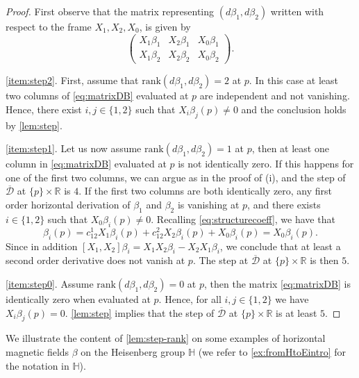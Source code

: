 \documentclass{amsart}
\theoremstyle{plain}
\theoremstyle{definition}
\theoremstyle{remark}
\newcommand{\R}{\mathbb{R}}
\newcommand{\diff}{d}%
\newcommand{\distr}{\mathcal{D}}								%
\newcommand{\B}{\beta}
\newcommand{\lift}[1]{\overline{#1}} 							%
\begin{document}
\begin{proof}
First observe that the matrix representing  $\left(\diff \B_1,\diff \B_2\right)$ written with respect to the frame $X_1,X_2,X_0$, is given by
\begin{equation}
\label{eq:matrixDB}
 \left( \begin{array}{ccc}
 X_1\B_1 &  X_2\B_1 &  X_0\B_1 \\
  X_1\B_2 &  X_2\B_2 &  X_0\B_2 
 \end{array} \right).
\end{equation}

\ref{item:step2}.
First, assume that $\mathrm{rank}\left(\diff \B_1,\diff \B_2\right)=2$ at $p$. In this case at least two columns of \eqref{eq:matrixDB} evaluated at $p$ are independent and not vanishing.  
Hence, there exist $i,j\in\{1,2\}$ such that $X_i\B_j(p) \neq 0$ and the conclusion holds by \cref{lem:step}.

\ref{item:step1}.
Let us now assume $\mathrm{rank}\left(\diff \B_1,\diff \B_2\right)=1$ at $p$, then at least one column in \eqref{eq:matrixDB} evaluated at $p$ is not identically zero. 
If this happens for one of the first two columns, we can argue as in the proof of (i), and the step of $\lift \distr$ at ${\{p\}\times \R}$ is $4$.
If the first two columns are both identically zero, any first order horizontal derivation of $\B_1$ and $\B_2$ is vanishing at $p$, and there exists $i\in \{1,2\}$  such that $X_0\B_i(p)\neq 0$. 
Recalling \eqref{eq:structurecoeff}, we have that
\begin{equation}
[X_1,X_2]\B_i(p)=c^1_{12}X_1\B_i(p)+c^2_{12}X_2\B_i(p)+X_0\B_i(p)=X_0\B_i(p).
\end{equation}
Since in addition $[X_1,X_2]\B_i=X_1X_2\B_i-X_2X_1\B_i$, we conclude that at least a second order derivative does not vanish at $p$. 
The step at $\lift \distr$ at ${\{p\}\times \R}$ is then $5$.

\ref{item:step0}.
Assume $\mathrm{rank}\left(\diff \B_1,\diff \B_2\right)=0$ at $p$, then the matrix \eqref{eq:matrixDB} is identically zero when evaluated at $p$. Hence, for all $i,j\in\{1,2\}$ we have $X_i\B_j(p)= 0$. \cref{lem:step} implies that the step of $\lift\distr$ at $\{p\}\times\R$ is at least $5$.
\end{proof}

We illustrate the content of \cref{lem:step-rank} on some examples of horizontal magnetic fields $\B$ on the Heisenberg group $\mathbb{H}$ (we refer to \cref{ex:fromHtoEintro} for the notation in $\mathbb{H}$).
\end{document}
